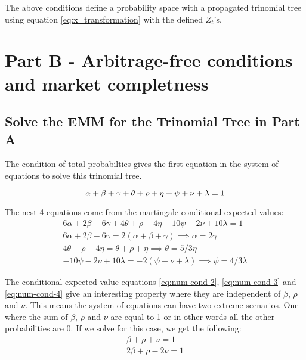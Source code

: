 \documentclass{article}
\begin{document}
The above conditions define a probability space with a propagated trinomial tree using equation \ref{eq:x_transformation} with the defined $Z_t$'s.

\section{Part B - Arbitrage-free conditions and market completness}

\subsection{Solve the EMM for the Trinomial Tree in Part A}

The condition of total probabilties gives the first equation in the system of equations to solve this trinomial tree.

\begin{equation}
    \alpha + \beta + \gamma + \theta + \rho + \eta + \psi + \nu + \lambda = 1 \label{eq:total-prob} \\
\end{equation}

The nest 4 equations come from the martingale conditional expected values:
\begin{align}
    6\alpha + 2\beta - 6\gamma + 4\theta + \rho - 4\eta - 10\psi - 2\nu + 10\lambda = 1 \label{eq:num-cond-1} \\
    6\alpha + 2\beta - 6\gamma = 2(\alpha + \beta + \gamma) \implies \alpha = 2\gamma \label{eq:num-cond-2} \\
    4\theta + \rho - 4\eta = \theta + \rho + \eta \implies \theta = 5/3\eta \label{eq:num-cond-3} \\
    - 10\psi - 2\nu + 10\lambda = - 2(\psi + \nu + \lambda) \implies \psi = 4/3 \lambda \label{eq:num-cond-4}
\end{align}

The conditional expected value equations \ref{eq:num-cond-2}, \ref{eq:num-cond-3} and \ref{eq:num-cond-4} give an interesting property where they are independent of $\beta$, $\rho$ and $\nu$. This means the system of equations can have two extreme scenarios. One where the sum of $\beta$, $\rho$ and $\nu$ are equal to 1 or in other words all the other probabilities are 0. If we solve for this case, we get the following:
\begin{align}
    \beta + \rho + \nu = 1 \label{eq:total-prob-sub-1} \\
    2\beta  + \rho - 2\nu = 1 \label{eq:num-cond-1-sub-1}
\end{align}
\end{document}
